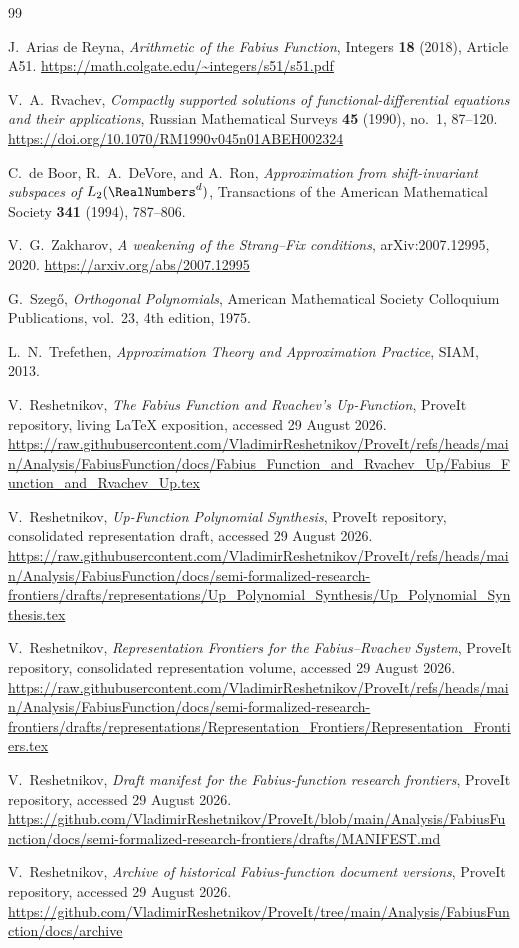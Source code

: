 \documentclass[11pt,oneside]{article}
\theoremstyle{definition}
\theoremstyle{remark}
\begin{document}
\begin{thebibliography}{99}

J.~Arias de Reyna,
\emph{Arithmetic of the Fabius Function},
Integers \textbf{18} (2018), Article A51.
\url{https://math.colgate.edu/~integers/s51/s51.pdf}

V.~A.~Rvachev,
\emph{Compactly supported solutions of functional-differential equations
and their applications},
Russian Mathematical Surveys \textbf{45} (1990), no.~1, 87--120.
\url{https://doi.org/10.1070/RM1990v045n01ABEH002324}

C.~de Boor, R.~A.~DeVore, and A.~Ron,
\emph{Approximation from shift-invariant subspaces of $L_2(\RealNumbers^d)$},
Transactions of the American Mathematical Society \textbf{341} (1994),
787--806.

V.~G.~Zakharov,
\emph{A weakening of the Strang--Fix conditions},
arXiv:2007.12995, 2020.
\url{https://arxiv.org/abs/2007.12995}

G.~Szeg\H{o},
\emph{Orthogonal Polynomials},
American Mathematical Society Colloquium Publications, vol.~23,
4th edition, 1975.

L.~N.~Trefethen,
\emph{Approximation Theory and Approximation Practice},
SIAM, 2013.

V.~Reshetnikov,
\emph{The Fabius Function and Rvachev's Up-Function},
ProveIt repository, living LaTeX exposition, accessed 29 August 2026.
\url{https://raw.githubusercontent.com/VladimirReshetnikov/ProveIt/refs/heads/main/Analysis/FabiusFunction/docs/Fabius_Function_and_Rvachev_Up/Fabius_Function_and_Rvachev_Up.tex}

V.~Reshetnikov,
\emph{Up-Function Polynomial Synthesis},
ProveIt repository, consolidated representation draft, accessed
29 August 2026.
\url{https://raw.githubusercontent.com/VladimirReshetnikov/ProveIt/refs/heads/main/Analysis/FabiusFunction/docs/semi-formalized-research-frontiers/drafts/representations/Up_Polynomial_Synthesis/Up_Polynomial_Synthesis.tex}

V.~Reshetnikov,
\emph{Representation Frontiers for the Fabius--Rvachev System},
ProveIt repository, consolidated representation volume, accessed
29 August 2026.
\url{https://raw.githubusercontent.com/VladimirReshetnikov/ProveIt/refs/heads/main/Analysis/FabiusFunction/docs/semi-formalized-research-frontiers/drafts/representations/Representation_Frontiers/Representation_Frontiers.tex}

V.~Reshetnikov,
\emph{Draft manifest for the Fabius-function research frontiers},
ProveIt repository, accessed 29 August 2026.
\url{https://github.com/VladimirReshetnikov/ProveIt/blob/main/Analysis/FabiusFunction/docs/semi-formalized-research-frontiers/drafts/MANIFEST.md}

V.~Reshetnikov,
\emph{Archive of historical Fabius-function document versions},
ProveIt repository, accessed 29 August 2026.
\url{https://github.com/VladimirReshetnikov/ProveIt/tree/main/Analysis/FabiusFunction/docs/archive}

\end{thebibliography}
\end{document}
